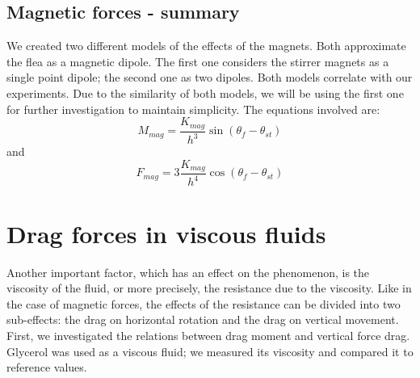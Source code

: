 \documentclass[10pt,a4paper]{article}
\begin{document}
\subsection{Magnetic forces - summary}
We created two different models of the effects of the magnets. Both approximate the flea as a magnetic dipole. The first one considers the stirrer magnets as a single point dipole; the second one as two dipoles. Both models correlate with our experiments. Due to the similarity of both models, we will be using the first one for further investigation to maintain simplicity. The equations involved are:
\begin{equation}
M_{mag} = \frac{K_{mag}}{h^3}\sin(\theta_f - \theta_{st})
\label{mmagshrnuti}
\end{equation}
and
\begin{equation}
F_{mag} = 3\frac{K_{mag}}{h^4}\cos(\theta_f - \theta_{st})
\label{fmagshrnuti}
\end{equation}

\section{Drag forces in viscous fluids}
Another important factor, which has an effect on the phenomenon, is the viscosity of the fluid, or more precisely,  the resistance due to the viscosity. Like in the case of magnetic forces, the effects of the resistance can be divided into two sub-effects: the drag on horizontal rotation and the drag on vertical movement. First, we investigated the relations between drag moment and vertical force drag. Glycerol was used as a viscous fluid; we measured its viscosity and compared it to reference values.
\end{document}
